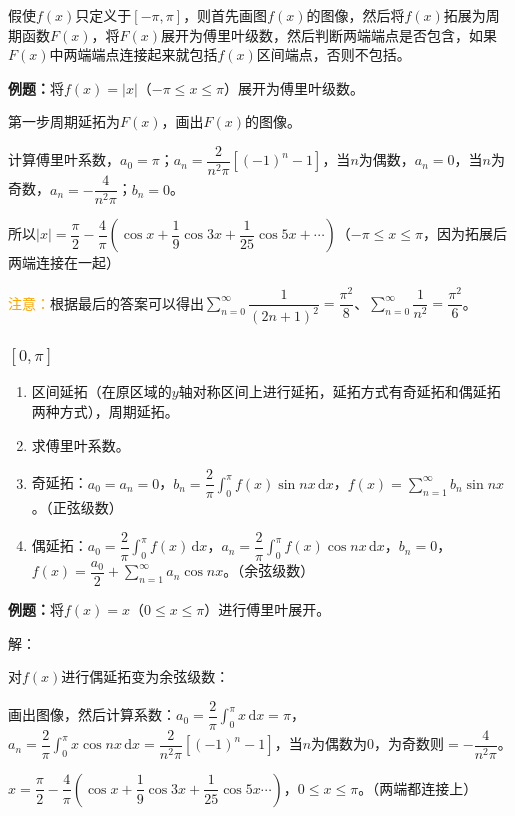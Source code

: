 假使$f(x)$只定义于$[-\pi,\pi]$，则首先画图$f(x)$的图像，然后将$f(x)$拓展为周期函数$F(x)$，将$F(x)$展开为傅里叶级数，然后判断两端端点是否包含，如果$F(x)$中两端端点连接起来就包括$f(x)$区间端点，否则不包括。

\textbf{例题：}将$f(x)=\vert x\vert$（$-\pi\leqslant x\leqslant\pi$）展开为傅里叶级数。

第一步周期延拓为$F(x)$，画出$F(x)$的图像。

计算傅里叶系数，$a_0=\pi$；$a_n=\dfrac{2}{n^2\pi}[(-1)^n-1]$，当$n$为偶数，$a_n=0$，当$n$为奇数，$a_n=-\dfrac{4}{n^2\pi}$；$b_n=0$。

所以$\vert x\vert=\dfrac{\pi}{2}-\dfrac{4}{\pi}(\cos x+\dfrac{1}{9}\cos3x+\dfrac{1}{25}\cos5x+\cdots)$（$-\pi\leqslant x\leqslant\pi$，因为拓展后两端连接在一起）

\textcolor{orange}{注意：}根据最后的答案可以得出$\sum\limits_{n=0}^\infty\dfrac{1}{(2n+1)^2}=\dfrac{\pi^2}{8}$、$\sum\limits_{n=0}^\infty\dfrac{1}{n^2}=\dfrac{\pi^2}{6}$。

\subsubsection{\texorpdfstring{$[0,\pi]$}n}

\begin{enumerate}
    \item 区间延拓（在原区域的$y$轴对称区间上进行延拓，延拓方式有奇延拓和偶延拓两种方式），周期延拓。
    \item 求傅里叶系数。
    \item 奇延拓：$a_0=a_n=0$，$b_n=\dfrac{2}{\pi}\int_0^\pi f(x)\sin nx\,\textrm{d}x$，$f(x)=\sum\limits_{n=1}^\infty b_n\sin nx$。（正弦级数）
    \item 偶延拓：$a_0=\dfrac{2}{\pi}\int_0^\pi f(x)\,\textrm{d}x$，$a_n=\dfrac{2}{\pi}\int_0^\pi f(x)\cos nx\,\textrm{d}x$，$b_n=0$，$f(x)=\dfrac{a_0}{2}+\sum\limits_{n=1}^\infty a_n\cos nx$。（余弦级数）
\end{enumerate}

\textbf{例题：}将$f(x)=x$（$0\leqslant x\leqslant\pi$）进行傅里叶展开。

解：

对$f(x)$进行偶延拓变为余弦级数：

画出图像，然后计算系数：$a_0=\dfrac{2}{\pi}\int_0^\pi x\,\textrm{d}x=\pi$，$a_n=\dfrac{2}{\pi}\int_0^\pi x\cos nx\,\textrm{d}x=\dfrac{2}{n^2\pi}[(-1)^n-1]$，当$n$为偶数为0，为奇数则$=-\dfrac{4}{n^2\pi}$。

$x=\dfrac{\pi}{2}-\dfrac{4}{\pi}\left(\cos x+\dfrac{1}{9}\cos3x+\dfrac{1}{25}\cos5x\cdots\right)$，$0\leqslant x\leqslant\pi$。（两端都连接上）

